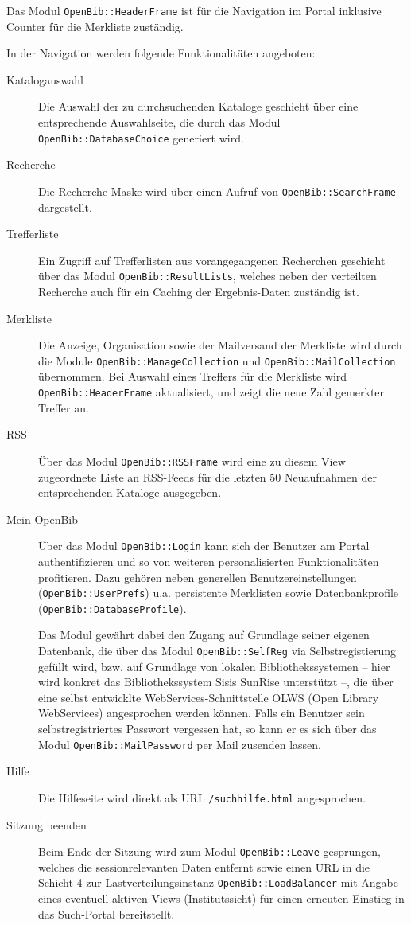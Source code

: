 \documentclass[11pt, twoside, a4paper, BCOR8mm, DIV12, bibtotoc,idxtotoc]{scrbook}
\begin{document}
Das Modul \texttt{OpenBib::HeaderFrame} ist für die Navigation im Portal
inklusive Counter für die Merkliste zuständig.

In der Navigation werden folgende Funktionalitäten angeboten:

\begin{description}
\item[Katalogauswahl] Die Auswahl der zu durchsuchenden Kataloge geschieht
  über eine entsprechende Aus\-wahl\-seite, die durch das Modul
  \texttt{OpenBib::DatabaseChoice} generiert wird.
\item[Recherche] Die Recherche-Maske wird über einen Aufruf von
  \texttt{OpenBib::SearchFrame} dargestellt.
\item[Trefferliste] Ein Zugriff auf Trefferlisten aus vorangegangenen
  Recherchen geschieht über das Modul \texttt{OpenBib::ResultLists},
  welches neben der verteilten Recherche auch für ein Caching der
  Ergebnis-Daten zuständig ist.
\item[Merkliste] Die Anzeige, Organisation sowie der Mailversand der
  Merkliste wird durch die Module
  \texttt{OpenBib::ManageCollection} und \texttt{OpenBib::MailCollection}
  über\-nom\-men. Bei Auswahl eines Treffers für die Merkliste wird
  \texttt{OpenBib::HeaderFrame} aktualisiert, und zeigt die neue Zahl
  gemerkter Treffer an.
\item[RSS] Über das Modul \texttt{OpenBib::RSSFrame} wird eine zu
  diesem View zugeordnete Liste an RSS-Feeds für die letzten 50
  Neuaufnahmen der entsprechenden Kataloge ausgegeben.
\item[Mein OpenBib] Über das Modul \texttt{OpenBib::Login}
  kann sich der Benutzer am Portal authentifizieren und so von
  weiteren personalisierten Funktionalitäten profitieren. Dazu
  gehören neben generellen Benutzereinstellungen
  (\texttt{OpenBib::UserPrefs}) u.a. per\-sis\-ten\-te Merklisten sowie
  Datenbankprofile (\texttt{OpenBib::DatabaseProfile}).

  Das Modul gewährt dabei den Zugang auf Grundlage seiner eigenen
  Datenbank, die über das Modul \texttt{OpenBib::SelfReg} via
  Selbstregistierung gefüllt wird, bzw. auf Grundlage von lokalen
  Bibliothekssystemen -- hier wird konkret das Bibliothekssystem Sisis
  SunRise unterstützt --, die über eine selbst entwicklte
  WebServices-Schnittstelle OLWS (Open Library WebServices)
  angesprochen werden können. Falls ein Benutzer sein
  selbstregistriertes Passwort vergessen hat, so kann er es sich über
  das Modul \texttt{OpenBib::MailPassword} per Mail zusenden lassen.
\item[Hilfe] Die Hilfeseite wird direkt als URL
  \texttt{/suchhilfe.html} angesprochen.
\item[Sitzung beenden] Beim Ende der Sitzung wird zum Modul
  \texttt{OpenBib::Leave} gesprungen, welches die sessionrelevanten Daten
  entfernt sowie einen URL in die Schicht 4 zur Lastver\-teilungs\-instanz
  \texttt{OpenBib::LoadBalancer} mit Angabe eines eventuell aktiven Views
  (Institutssicht) für einen er\-neu\-ten Einstieg in das Such-Portal
  bereitstellt.

\end{description}
\end{document}
